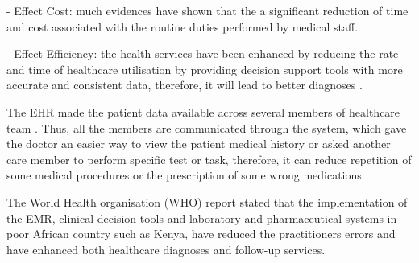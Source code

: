 - Effect Cost: much evidences have shown that the a significant reduction of time and cost associated with the routine duties performed by medical staff\cite{chaudhry2006systematic}.

- Effect Efficiency: the health services  have been enhanced by reducing the rate and time of healthcare utilisation by providing decision support tools with more accurate and consistent data, therefore, it will lead to better diagnoses \cite{chaudhry2006systematic}.

The EHR made the patient data available across several members of healthcare team . Thus, all the members are communicated through the system, which gave the doctor an easier way to view the patient medical history or asked another care member to perform specific test or task, therefore, it can reduce repetition of some medical procedures or the prescription of some wrong medications \cite{OfHealth}. 

The World Health organisation (WHO) \cite{WorldHealthOrganization2013} report stated that the implementation of the EMR, clinical decision tools and laboratory and pharmaceutical systems in poor African country such as Kenya, have reduced the practitioners errors and have enhanced both healthcare diagnoses and follow-up services.














